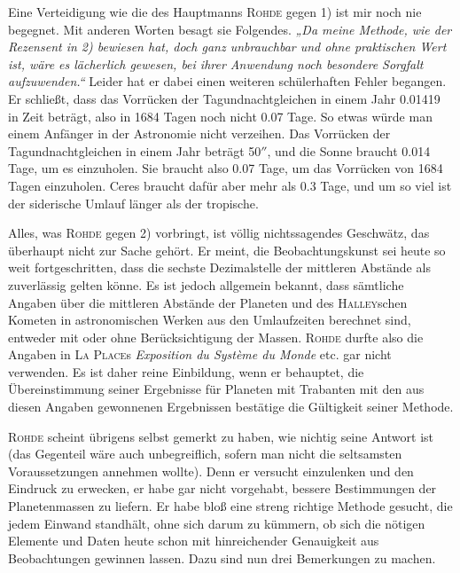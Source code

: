 Eine Verteidigung wie die des Hauptmanns \textsc{Rohde} gegen 1) ist mir noch nie begegnet. Mit anderen Worten besagt sie Folgendes. \emph{„Da meine Methode, wie der Rezensent in 2) bewiesen hat, doch ganz unbrauchbar und ohne praktischen Wert ist, wäre es lächerlich gewesen, bei ihrer Anwendung noch besondere Sorgfalt aufzuwenden.“} Leider hat er dabei einen weiteren schülerhaften Fehler begangen. Er schließt, dass das Vorrücken der Tagundnachtgleichen in einem Jahr 0.01419 in Zeit beträgt, also in 1684 Tagen noch nicht 0.07 Tage. So etwas würde man einem Anfänger in der Astronomie nicht verzeihen. Das Vorrücken der Tagundnachtgleichen in einem Jahr beträgt 50$''$, und die Sonne braucht 0.014 Tage, um es einzuholen. Sie braucht also 0.07 Tage, um das Vorrücken von 1684 Tagen einzuholen. Ceres braucht dafür aber mehr als 0.3 Tage, und um so viel ist der siderische Umlauf länger als der tropische.

Alles, was \textsc{Rohde} gegen 2) vorbringt, ist völlig nichtssagendes Geschwätz, das überhaupt nicht zur Sache gehört. Er meint, die Beobachtungskunst sei heute so weit fortgeschritten, dass die sechste Dezimalstelle der mittleren Abstände als zuverlässig gelten könne. Es ist jedoch allgemein bekannt, dass sämtliche Angaben über die mittleren Abstände der Planeten und des \textsc{Halley}schen Kometen in astronomischen Werken aus den Umlaufzeiten berechnet sind, entweder mit oder ohne Berücksichtigung der Massen. \textsc{Rohde} durfte also die Angaben in \textsc{La Place}s \emph{Exposition du Système du Monde} etc. gar nicht verwenden. Es ist daher reine Einbildung, wenn er behauptet, die Übereinstimmung seiner Ergebnisse für Planeten mit Trabanten mit den aus diesen Angaben gewonnenen Ergebnissen bestätige die Gültigkeit seiner Methode.

\textsc{Rohde} scheint übrigens selbst gemerkt zu haben, wie nichtig seine Antwort ist (das Gegenteil wäre auch unbegreiflich, sofern man nicht die seltsamsten Voraussetzungen annehmen wollte). Denn er versucht einzulenken und den Eindruck zu erwecken, er habe gar nicht vorgehabt, bessere Bestimmungen der Planetenmassen zu liefern. Er habe bloß eine streng richtige Methode gesucht, die jedem Einwand standhält, ohne sich darum zu kümmern, ob sich die nötigen Elemente und Daten heute schon mit hinreichender Genauigkeit aus Beobachtungen gewinnen lassen. Dazu sind nun drei Bemerkungen zu machen.

